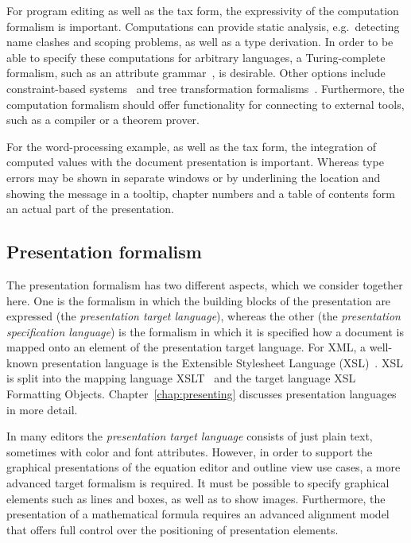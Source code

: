 
For program editing as well as the tax form, the expressivity of the computation formalism is important. Computations can provide static analysis, e.g.\ detecting name clashes and scoping problems, as well as a type derivation. In order to be able to specify these computations for arbitrary languages, a Turing-complete formalism, such as an attribute grammar~\cite{swierstra04ag}, is desirable. Other options include constraint-based systems~\cite{ganzevoort92views, christopher90constraints, ballance92pan} and tree transformation formalisms~\cite{visser01stratego, xslt10}. Furthermore, the computation formalism should offer functionality for connecting to external tools, such as a compiler or a theorem prover.

For the word-processing example, as well as the tax form, the integration of computed values with the document presentation is important. Whereas type errors may be shown in separate windows or by underlining the location and showing the message in a tooltip, chapter numbers and a table of contents form an actual part of the presentation. 



%																
\subsection{Presentation formalism} \label{sect:presentationFormalism}

The presentation formalism has two different aspects, which we consider together here. One is the formalism in which the building blocks of the presentation are expressed (the {\em presentation target language}), whereas the other  (the {\em presentation specification language}) is the formalism in which it is specified how a document is mapped onto an element of the presentation target language. For XML, a well-known presentation language is the Extensible Stylesheet Language (XSL)~\cite{xsl10}. XSL is split into the mapping language XSLT~\cite{xslt10} and the target language XSL Formatting Objects. Chapter~\ref{chap:presenting} discusses presentation languages in more detail.

In many editors the {\em presentation target language} consists of just plain text, sometimes with color and font attributes. However, in order to support the graphical presentations of the equation editor and outline view use cases, a more advanced target formalism is required. It must be possible to specify graphical elements such as lines and boxes, as well as to show images. Furthermore, the presentation of a mathematical formula requires an advanced alignment model that offers full control over the positioning of presentation elements.

